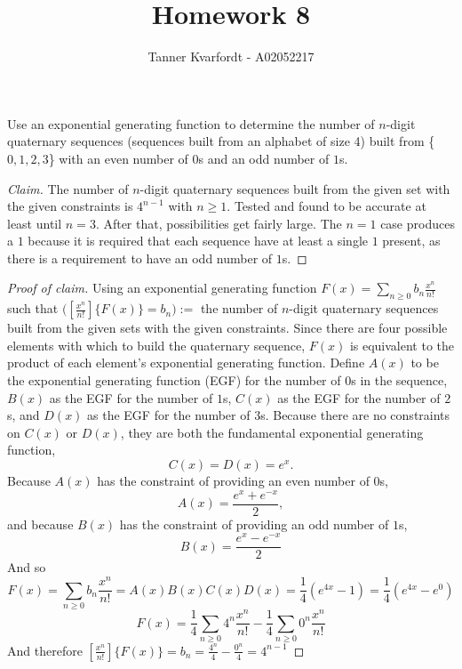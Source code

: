 \documentclass[12pt]{article}
\newenvironment{problem}[2][Problem]{\begin{trivlist}
\item[\hskip \labelsep {\bfseries #1}\hskip \labelsep {\bfseries #2.}]}{\end{trivlist}}
\begin{document}
 
 
\title{Homework 8}
\author{Tanner Kvarfordt - A02052217}
\maketitle
 
\begin{problem}{1}
Use an exponential generating function to determine the number of $n$-digit quaternary sequences (sequences built from an alphabet of size 4) built from \{$0,1,2,3$\} with an even number of $0$s and an odd number of $1$s.
\end{problem}
 
\begin{proof}[Claim]
The number of $n$-digit quaternary sequences built from the given set with the given constraints is $4^{n-1}$ with $n \geq 1$. Tested and found to be accurate at least until $n=3$. After that, possibilities get fairly large. The $n=1$ case produces a $1$ because it is required that each sequence have at least a single $1$ present, as there is a requirement to have an odd number of $1$s.
\end{proof}

\begin{proof}[Proof of claim]
Using an exponential generating function $F(x)=\sum_{n\geq0}b_n\frac{x^n}{n!}$ such that $\big([\frac{x^n}{n!}]\{F(x)\}=b_n\big):=$ the number of $n$-digit quaternary sequences built from the given sets with the given constraints. Since there are four possible elements with which to build the quaternary sequence, $F(x)$ is equivalent to the product of each element's exponential generating function. Define $A(x)$ to be the exponential generating function (EGF) for the number of $0$s in the sequence, $B(x)$ as the EGF for the number of $1$s, $C(x)$ as the EGF for the number of $2$s, and $D(x)$ as the EGF for the number of $3$s. Because there are no constraints on $C(x)$ or $D(x)$, they are both the fundamental exponential generating function, \[C(x)=D(x)=e^x.\] Because $A(x)$ has the constraint of providing an even number of $0$s, \[A(x)=\frac{e^x+e^{-x}}{2},\] and because $B(x)$ has the constraint of providing an odd number of $1$s, \[B(x)=\frac{e^x-e^{-x}}{2}\]
And so 
\[F(x)=\sum_{n\geq0}b_n\frac{x^n}{n!}=A(x)B(x)C(x)D(x)=\frac{1}{4}(e^{4x}-1)=\frac{1}{4}(e^{4x}-e^0)\]
\[F(x)=\frac{1}{4}\sum_{n \geq 0}4^n\frac{x^n}{n!}-\frac{1}{4}\sum_{n\geq0}0^n\frac{x^n}{n!}\]
And therefore $[\frac{x^n}{n!}]\{F(x)\}=b_n=\frac{4^n}{4}-\frac{0^n}{4}=4^{n-1}$
\end{proof}
\end{document}
